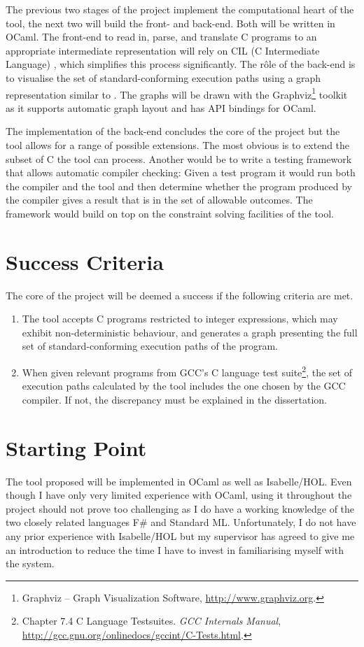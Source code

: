\documentclass[a4paper,12pt]{scrbook}
\theoremstyle{plain}
\theoremstyle{definition}
\begin{document}
The previous two stages of the project implement the computational heart of the tool, the next two will build the front- and back-end. Both will be written in OCaml. The front-end to read in, parse, and translate C programs to an appropriate intermediate representation will rely on CIL (C Intermediate Language) \cite{cil}, which simplifies this process significantly. The r\^ole of the back-end is to visualise the set of standard-conforming execution paths using a graph representation similar to \cite{cpp}. The graphs will be drawn with the Graphviz\footnote{Graphviz -- Graph Visualization Software, \url{http://www.graphviz.org}.} toolkit as it supports automatic graph layout and has API bindings for OCaml.

The implementation of the back-end concludes the core of the project but the tool allows for a range of possible extensions. The most obvious is to extend the subset of C the tool can process.
Another would be to write a testing framework that allows automatic compiler checking: Given a test program it would run both the compiler and the tool and then determine whether the program produced by the compiler gives a result that is in the set of allowable outcomes. The framework would build on top on the constraint solving facilities of the tool.

\section*{Success Criteria}
The core of the project will be deemed a success if the following criteria are met.
\begin{enumerate}
 \item The tool accepts C programs restricted to integer expressions, which may exhibit non-deterministic behaviour, and generates a graph presenting the full set of standard-conforming execution paths of the program.
 \item When given relevant programs from GCC's C language test suite\footnote{Chapter 7.4 C Language Testsuites. \textit{GCC Internals Manual}, \url{http://gcc.gnu.org/onlinedocs/gccint/C-Tests.html}.}, the set of execution paths calculated by the tool includes the one chosen by the GCC compiler. If not, the discrepancy must be explained in the dissertation.
\end{enumerate}

\section*{Starting Point}
The tool proposed will be implemented in OCaml as well as Isabelle/HOL. Even though I have only very limited experience with OCaml, using it throughout the project should not prove too challenging as I do have a working knowledge of the two closely related languages F\# and Standard ML. Unfortunately, I do not have any prior experience with Isabelle/HOL but my supervisor has agreed to give me an introduction to reduce the time I have to invest in familiarising myself with the system.
\end{document}
